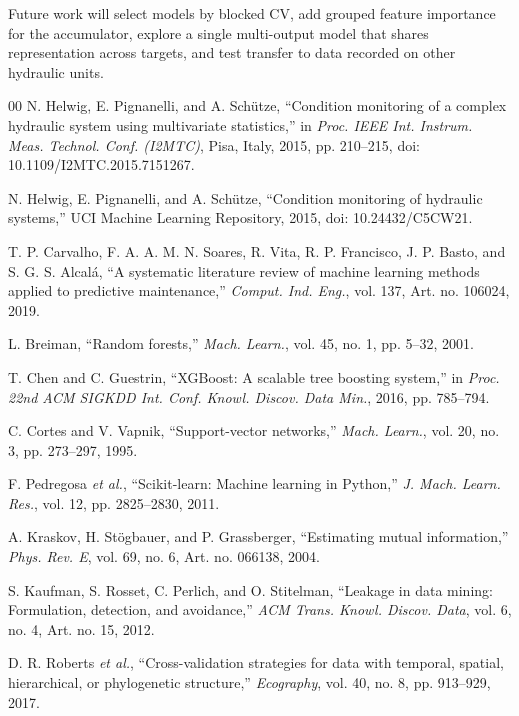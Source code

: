 \documentclass[conference]{IEEEtran}
\begin{document}
Future work will select models by blocked CV, add grouped feature
importance for the accumulator, explore a single multi-output model that
shares representation across targets, and test transfer to data recorded on
other hydraulic units.

\begin{thebibliography}{00}
 N. Helwig, E. Pignanelli, and A. Sch\"{u}tze,
``Condition monitoring of a complex hydraulic system using multivariate
statistics,'' in \textit{Proc. IEEE Int. Instrum. Meas. Technol. Conf.
(I2MTC)}, Pisa, Italy, 2015, pp. 210--215,
doi: 10.1109/I2MTC.2015.7151267.

 N. Helwig, E. Pignanelli, and A. Sch\"{u}tze,
``Condition monitoring of hydraulic systems,'' UCI Machine Learning
Repository, 2015, doi: 10.24432/C5CW21.

 T. P. Carvalho, F. A. A. M. N. Soares, R. Vita,
R. P. Francisco, J. P. Basto, and S. G. S. Alcal\'{a}, ``A systematic
literature review of machine learning methods applied to predictive
maintenance,'' \textit{Comput. Ind. Eng.}, vol. 137, Art. no. 106024, 2019.

 L. Breiman, ``Random forests,'' \textit{Mach. Learn.},
vol. 45, no. 1, pp. 5--32, 2001.

 T. Chen and C. Guestrin, ``XGBoost: A scalable tree
boosting system,'' in \textit{Proc. 22nd ACM SIGKDD Int. Conf. Knowl. Discov.
Data Min.}, 2016, pp. 785--794.

 C. Cortes and V. Vapnik, ``Support-vector networks,''
\textit{Mach. Learn.}, vol. 20, no. 3, pp. 273--297, 1995.

 F. Pedregosa \textit{et al.}, ``Scikit-learn: Machine
learning in Python,'' \textit{J. Mach. Learn. Res.}, vol. 12,
pp. 2825--2830, 2011.

 A. Kraskov, H. St\"{o}gbauer, and P. Grassberger,
``Estimating mutual information,'' \textit{Phys. Rev. E}, vol. 69, no. 6,
Art. no. 066138, 2004.

 S. Kaufman, S. Rosset, C. Perlich, and O. Stitelman,
``Leakage in data mining: Formulation, detection, and avoidance,''
\textit{ACM Trans. Knowl. Discov. Data}, vol. 6, no. 4, Art. no. 15, 2012.

 D. R. Roberts \textit{et al.}, ``Cross-validation
strategies for data with temporal, spatial, hierarchical, or phylogenetic
structure,'' \textit{Ecography}, vol. 40, no. 8, pp. 913--929, 2017.
\end{thebibliography}
\end{document}
